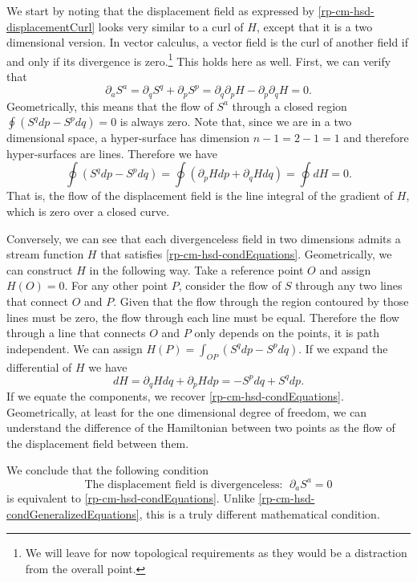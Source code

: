 We start by noting that the displacement field as expressed by \ref{rp-cm-hsd-displacementCurl} looks very similar to a curl of $H$, except that it is a two dimensional version. In vector calculus, a vector field is the curl of another field if and only if its divergence is zero.\footnote{We will leave for now topological requirements as they would be a distraction from the overall point.} This holds here as well. First, we can verify that
\begin{equation}
	\partial_a S^a = \partial_q S^q + \partial_p S^p = \partial_q \partial_p H - \partial_p \partial_q H = 0.
\end{equation}
Geometrically, this means that the flow of $S^a$ through a closed region $\oint \left( S^q dp - S^p dq \right) = 0$ is always zero. Note that, since we are in a two dimensional space, a hyper-surface has dimension $n-1 = 2-1 = 1$ and therefore hyper-surfaces are lines. Therefore we have 
\begin{equation}
	\oint \left( S^q dp - S^p dq \right) = \oint \left( \partial_p H dp + \partial_q H dq \right) = \oint dH = 0.
\end{equation}
That is, the flow of the displacement field is the line integral of the gradient of $H$, which is zero over a closed curve.

Conversely, we can see that each divergenceless field in two dimensions admits a stream function $H$ that satisfies \ref{rp-cm-hsd-condEquations}. Geometrically, we can construct $H$ in the following way. Take a reference point $O$ and assign $H(O) = 0$. For any other point $P$, consider the flow of $S$ through any two lines that connect $O$ and $P$. Given that the flow through the region contoured by those lines must be zero, the flow through each line must be equal. Therefore the flow through a line that connects $O$ and $P$ only depends on the points, it is path independent. We can assign $H(P) = \int_{OP} \left( S^q dp - S^p dq \right)$. If we expand the differential of $H$ we have
\begin{equation}
	dH = \partial_q H dq + \partial_p H dp = - S^p dq + S^q dp.
\end{equation}
If we equate the components, we recover \ref{rp-cm-hsd-condEquations}. Geometrically, at least for the one dimensional degree of freedom, we can understand the difference of the Hamiltonian between two points as the flow of the displacement field between them.

We conclude that the following condition
\begin{equation}\label{rp-cm-hsd-condDivergenceDisplacement}
	\tag{HM-2}
	\text{The displacement field is divergenceless: } \; \partial_a S^a = 0
\end{equation}
is equivalent to \ref{rp-cm-hsd-condEquations}. Unlike \ref{rp-cm-hsd-condGeneralizedEquations}, this is a truly different mathematical condition.

